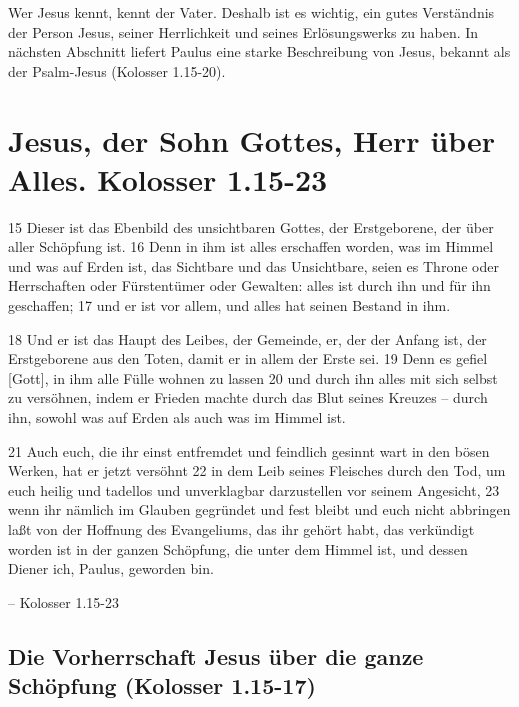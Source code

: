 \documentclass[
  12pt,
]{krantz}
\makeatletter
\newenvironment{kframe}{%
\medskip{}
\setlength{\fboxsep}{.8em}
 \def\at@end@of@kframe{}%
 \ifinner\ifhmode%
  \def\at@end@of@kframe{\end{minipage}}%
  \begin{minipage}{\columnwidth}%
 \fi\fi%
 \def\FrameCommand##1{\hskip\@totalleftmargin \hskip-\fboxsep
 \colorbox{shadecolor}{##1}\hskip-\fboxsep
     \hskip-\linewidth \hskip-\@totalleftmargin \hskip\columnwidth}%
 \MakeFramed {\advance\hsize-\width
   \@totalleftmargin\z@ \linewidth\hsize
   \@setminipage}}%
 {\par\unskip\endMakeFramed%
 \at@end@of@kframe}
\newenvironment{rmdblock}[1]
  {
  \begin{itemize}
  \renewcommand{\labelitemi}{
    \raisebox{-.7\height}[0pt][0pt]{
      {\setkeys{Gin}{width=3em,keepaspectratio}\texttt{[image: img/\#1]}}
    }
  }
  \setlength{\fboxsep}{1em}
  \begin{kframe}
  \item
  }
  {
  \end{kframe}
  \end{itemize}
  }
\newenvironment{rmdquote}
  {\begin{rmdblock}{quote}}
  {\end{rmdblock}}
\makeatother
\begin{document}
Wer Jesus kennt, kennt der Vater. Deshalb ist es wichtig, ein gutes Verständnis der Person Jesus, seiner Herrlichkeit und seines Erlösungswerks zu haben. In nächsten Abschnitt liefert Paulus eine starke Beschreibung von Jesus, bekannt als der Psalm-Jesus (Kolosser 1.15-20).

\hypertarget{teil_02}{%
\chapter{Jesus, der Sohn Gottes, Herr über Alles. Kolosser 1.15-23}\label{teil_02}}

\begin{rmdquote}
15 Dieser ist das Ebenbild des unsichtbaren Gottes, der Erstgeborene,
der über aller Schöpfung ist. 16 Denn in ihm ist alles erschaffen
worden, was im Himmel und was auf Erden ist, das Sichtbare und das
Unsichtbare, seien es Throne oder Herrschaften oder Fürstentümer oder
Gewalten: alles ist durch ihn und für ihn geschaffen; 17 und er ist vor
allem, und alles hat seinen Bestand in ihm.

18 Und er ist das Haupt des Leibes, der Gemeinde, er, der der Anfang
ist, der Erstgeborene aus den Toten, damit er in allem der Erste sei. 19
Denn es gefiel {[}Gott{]}, in ihm alle Fülle wohnen zu lassen 20 und
durch ihn alles mit sich selbst zu versöhnen, indem er Frieden machte
durch das Blut seines Kreuzes -- durch ihn, sowohl was auf Erden als
auch was im Himmel ist.

21 Auch euch, die ihr einst entfremdet und feindlich gesinnt wart in den
bösen Werken, hat er jetzt versöhnt 22 in dem Leib seines Fleisches
durch den Tod, um euch heilig und tadellos und unverklagbar darzustellen
vor seinem Angesicht, 23 wenn ihr nämlich im Glauben gegründet und fest
bleibt und euch nicht abbringen laßt von der Hoffnung des Evangeliums,
das ihr gehört habt, das verkündigt worden ist in der ganzen Schöpfung,
die unter dem Himmel ist, und dessen Diener ich, Paulus, geworden bin.

-- Kolosser 1.15-23
\end{rmdquote}

\hypertarget{die-vorherrschaft-jesus-uxfcber-die-ganze-schuxf6pfung-kolosser-1.15-17}{%
\section{Die Vorherrschaft Jesus über die ganze Schöpfung (Kolosser 1.15-17)}\label{die-vorherrschaft-jesus-uxfcber-die-ganze-schuxf6pfung-kolosser-1.15-17}}
\end{document}
